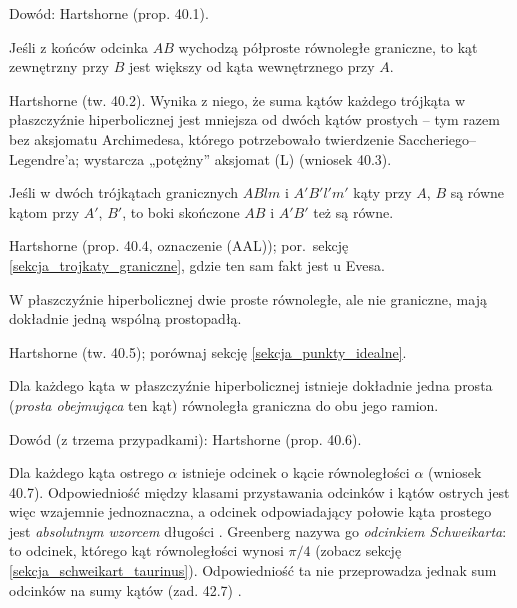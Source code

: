 Dowód: Hartshorne \cite[s. 375]{hartshorne_2000} (prop. 40.1). %

\begin{theorem}
	Jeśli z końców odcinka $AB$ wychodzą półproste równoległe graniczne, to kąt zewnętrzny przy $B$ jest większy od kąta wewnętrznego przy $A$. %
\end{theorem}

Hartshorne \cite[s. 376]{hartshorne_2000} (tw. 40.2). %
Wynika z niego, że suma kątów każdego trójkąta w płaszczyźnie hiperbolicznej jest mniejsza od dwóch kątów prostych -- tym razem bez aksjomatu Archimedesa, którego potrzebowało twierdzenie Saccheriego--Legendre'a; wystarcza „potężny'' aksjomat (L) \cite[s. 376--377]{hartshorne_2000} (wniosek 40.3). %

\begin{theorem}
	Jeśli w dwóch trójkątach granicznych $ABlm$ i $A'B'l'm'$ kąty przy $A$, $B$ są równe kątom przy $A'$, $B'$, to boki skończone $AB$ i $A'B'$ też są równe. %
\end{theorem}

Hartshorne \cite[s. 377]{hartshorne_2000} (prop. 40.4, oznaczenie (AAL)); por.~sekcję \ref{sekcja_trojkaty_graniczne}, gdzie ten sam fakt jest u Evesa. %

\begin{theorem}
[Hilberta] %
	W płaszczyźnie hiperbolicznej dwie proste równoległe, ale nie graniczne, mają dokładnie jedną wspólną prostopadłą. %
\end{theorem}

Hartshorne \cite[s. 377--378]{hartshorne_2000} (tw. 40.5); porównaj sekcję \ref{sekcja_punkty_idealne}. %

\begin{proposition}
	Dla każdego kąta w płaszczyźnie hiperbolicznej istnieje dokładnie jedna prosta (\emph{prosta obejmująca} ten kąt) równoległa graniczna do obu jego ramion. %
\end{proposition}

Dowód (z trzema przypadkami): Hartshorne \cite[s. 378--380]{hartshorne_2000} (prop. 40.6). %

Dla każdego kąta ostrego $\alpha$ istnieje odcinek o kącie równoległości $\alpha$ (wniosek 40.7). %
Odpowiedniość między klasami przystawania odcinków i kątów ostrych jest więc wzajemnie jednoznaczna, a odcinek odpowiadający połowie kąta prostego jest \emph{absolutnym wzorcem} długości \cite[s. 380]{hartshorne_2000}. %
Greenberg \cite[s. 211]{greenberg_2010} nazywa go \emph{odcinkiem Schweikarta}: to odcinek, którego kąt równoległości wynosi $\pi/4$ (zobacz sekcję \ref{sekcja_schweikart_taurinus}). %
Odpowiedniość ta nie przeprowadza jednak sum odcinków na sumy kątów (zad. 42.7) \cite[s. 380]{hartshorne_2000}. %

